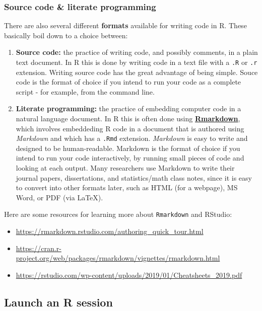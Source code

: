 \documentclass[]{book}
\providecommand{\tightlist}{%
  \setlength{\itemsep}{0pt}\setlength{\parskip}{0pt}}
\begin{document}
\hypertarget{source-code-literate-programming}{%
\subsubsection{Source code \& literate programming}\label{source-code-literate-programming}}

There are also several different \textbf{formats} available for writing code in R.
These basically boil down to a choice between:

\begin{enumerate}
\def\labelenumi{\arabic{enumi}.}
\item
  \textbf{Source code:} the practice of writing code, and possibly comments, in a plain text document. In R this is done by writing code in a text file with a \texttt{.R} or \texttt{.r} extension. Writing source code has the great advantage of being simple. Souce code is the format of choice if you intend to run your code as a complete script - for example, from the command line.
\item
  \textbf{Literate programming:} the practice of embedding computer code in a natural language document. In R this is often done using \href{https://rmarkdown.rstudio.com/}{\textbf{Rmarkdown}}, which involves embeddeding R code in a document that is authored using \emph{Markdown} and which has a \texttt{.Rmd} extension. \emph{Markdown} is easy to write and designed to be human-readable. Markdown is the format of choice if you intend to run your code interactively, by running small pieces of code and looking at each output. Many researchers use Markdown to write their journal papers, dissertations, and statistics/math class notes, since it is easy to convert into other formats later, such as HTML (for a webpage), MS Word, or PDF (via LaTeX).
\end{enumerate}

Here are some resources for learning more about \texttt{Rmarkdown} and RStudio:

\begin{itemize}
\tightlist
\item
  \url{https://rmarkdown.rstudio.com/authoring_quick_tour.html}
\item
  \url{https://cran.r-project.org/web/packages/rmarkdown/vignettes/rmarkdown.html}
\item
  \url{https://rstudio.com/wp-content/uploads/2019/01/Cheatsheets_2019.pdf}
\end{itemize}

\hypertarget{launch-an-r-session-1}{%
\subsection{Launch an R session}\label{launch-an-r-session-1}}
\end{document}
